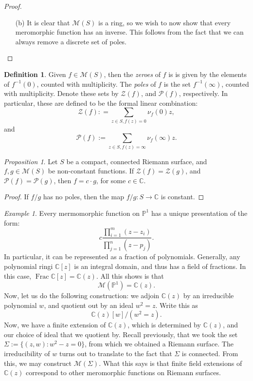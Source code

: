 \documentclass[a4paper]{report}
\theoremstyle{definition}
\newtheorem{definition}{Definition}
\theoremstyle{remark}
\theoremstyle{proposition}
\newtheorem{proposition}{Proposition}
\theoremstyle{conjecture}
\theoremstyle{lemma}
\theoremstyle{corollary}
\theoremstyle{exercise}
\theoremstyle{example}
\newtheorem{example}{Example}
\newcommand{\C}{\mathbb{C}}
\newcommand{\mcal}{\mathcal}
\newcommand{\on}{\operatorname}
\begin{document}
\begin{proof}
    \begin{itemize}
        \item[(b)] It is clear that $\mcal{M}(S)$ is a ring, so we wish to now 
            show that every meromorphic function has an inverse. This follows
            from the fact that we can always remove a discrete set of poles.
    \end{itemize}
\end{proof}

\begin{definition}
        Given $f \in \mcal{M}(S)$, then the \emph{zeroes} of $f$ 
        is is given by the elements of $f^{-1}(0)$, counted with multiplicity. The \emph{poles}
        of $f$ is the set $f^{-1}(\infty)$, counted with multiplicity. Denote
        these sets by $\mcal{Z}(f)$, and $\mcal{P}(f)$, respectively. 
        In particular, these are defined to be the formal linear 
        combination:
        $$\mcal{Z}(f) : = \sum_{z \in S, f(z) =0}\nu_f(0)z,$$
        and $$\mcal{P}(f) := \sum_{z\in S, f(z) = \infty}\nu_f(\infty)z.$$
\end{definition}

\begin{proposition}
    Let $S$ be a compact, connected Riemann surface, and 
    $f,g \in \mcal{M}(S)$ be non-constant functions. If $\mcal{Z}(f) = \mcal{Z}(g)$, and $\mcal{P}(f) = \mcal{P}(g)$, then $f = c\cdot g$, for some $c \in \C$.
\end{proposition}

\begin{proof}
    If $f/g$ has no poles, then the map $f/g : S \to \C$ is constant.
\end{proof}

\begin{example}
    Every mermomorphic function on $\mathbb{P}^1$ has a unique presentation 
    of the form: $$c\frac{\prod_{i=1}^m (z-z_i)}{\prod_{j=1}^n(z-p_j)}.$$
    In particular, it can be represented as a fraction of polynomials.
    Generally, any polynomial ringi $\C[z]$ is an integral domain, and thus has a field 
    of fractions. In this case, $\on{Frac}\C[z] = \C(z)$. All this shows is that 
    $$\mcal{M}(\mathbb{P}^1) = \C(z).$$
    Now, let us do the following construction: we adjoin $\C(z)$ by an 
    irreducible polynomial $w$, and 
    quotient out by an ideal $w^2=z$. Write this as 
    $$\C(z)[w] /(w^2 = z).$$
    Now, we have a finite extension of $\C(z)$, which is determined by $\C(z)$,
    and our choice of ideal that we quotient by. 
    Recall previously, that we took the set $\Sigma := \lbrace (z,w) : w^2 -z=0\rbrace$,
    from which we obtained a Riemann surface. The irreducibility of $w$ turns out
    to translate to the fact that $\Sigma$ is connected. From this, we may 
    construct $\mcal{M}(\Sigma)$. What this says is that finite field extensions
    of $\C(z)$ correspond to other meromorphic functions on Riemann surfaces.
\end{example}
\end{document}
